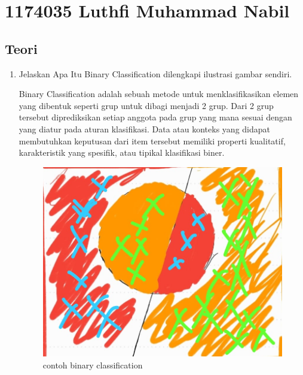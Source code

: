 \section{1174035 Luthfi Muhammad Nabil}

\subsection{Teori}
\begin{enumerate}
\item Jelaskan Apa Itu Binary Classification dilengkapi ilustrasi gambar sendiri.\par
Binary Classification adalah sebuah metode untuk menklasifikasikan elemen yang dibentuk seperti grup untuk dibagi menjadi 2 grup. Dari 2 grup tersebut diprediksikan setiap anggota pada grup yang mana sesuai dengan yang diatur pada aturan klasifikasi. Data atau konteks yang didapat membutuhkan keputusan dari item tersebut memiliki properti kualitatif, karakteristik yang spesifik, atau tipikal klasifikasi biner.
\begin{figure}[H]
\centering
\includegraphics[scale=0.2]{figures/1174035/chapter2/binary_classification.jpeg}
\caption{contoh binary classification}
\label{contoh}
\end{figure}



\end{enumerate}
